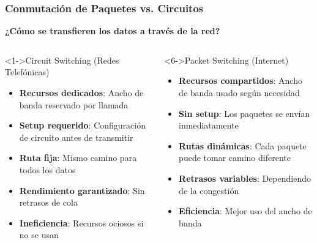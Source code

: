 \documentclass[aspectratio=169]{beamer}
\begin{document}
      \begin{frame}
      \frametitle{Conmutación de Paquetes vs. Circuitos}
      
      \begin{center}
      \Large \textbf{¿Cómo se transfieren los datos a través de la red?}
      \end{center}
      
      \begin{columns}
      \begin{block}<1->{Circuit Switching (Redes Telefónicas)}
      \begin{itemize}
      \item<1-> \textbf{Recursos dedicados}: Ancho de banda reservado por llamada
      \item<2-> \textbf{Setup requerido}: Configuración de circuito antes de transmitir
      \item<3-> \textbf{Ruta fija}: Mismo camino para todos los datos
      \item<4-> \textbf{Rendimiento garantizado}: Sin retrasos de cola
      \item<5-> \textbf{Ineficiencia}: Recursos ociosos si no se usan
      \end{itemize}
      \end{block}
      
      \begin{block}<6->{Packet Switching (Internet)}
      \begin{itemize}
      \item<6-> \textbf{Recursos compartidos}: Ancho de banda usado según necesidad
      \item<7-> \textbf{Sin setup}: Los paquetes se envían inmediatamente
      \item<8-> \textbf{Rutas dinámicas}: Cada paquete puede tomar camino diferente
      \item<9-> \textbf{Retrasos variables}: Dependiendo de la congestión
      \item<10-> \textbf{Eficiencia}: Mejor uso del ancho de banda
      \end{itemize}
      \end{block}
      \end{columns}
      \end{frame}
      
\end{document}
